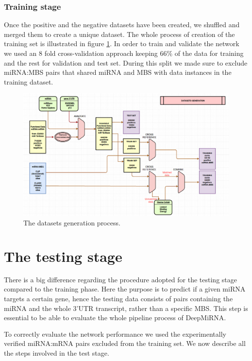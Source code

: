 \subsubsection{Training stage}
Once the positive and the negative datasets have been created, we shuffled and merged them to create a unique dataset. The whole process of creation of the training set is illustrated in figure \ref{fig:training}. In order to train and validate the network we used an 8 fold cross-validation approach keeping 66\% of the data for training and the rest for validation and test set. During this split we made sure to exclude miRNA:MBS pairs that shared miRNA and MBS with data instances in the training dataset.

\begin{figure}[hbt!]
	\centering
	\includegraphics[width=1\textwidth]{Figures/training}
	\caption{The datasets generation process.}
	\label{fig:training}
\end{figure}

\section{The testing stage}
There is a big difference regarding the procedure adopted for the testing stage compared to the training phase. Here the purpose is to predict if a given miRNA targets a certain gene, hence the testing data consists of pairs containing the miRNA and the whole 3'UTR transcript, rather than a specific MBS. This step is essential to be able to evaluate the whole pipeline process of DeepMiRNA. 

To correctly evaluate the network performance we used the experimentally verified miRNA:mRNA pairs excluded from the training set. We now describe all the steps involved in the test stage. 

